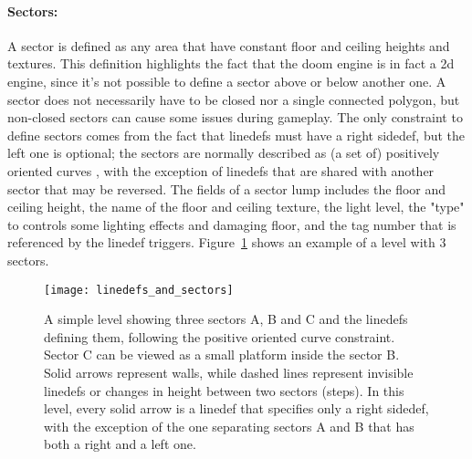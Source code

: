 \paragraph{Sectors:} A sector is defined as any area that have constant floor and ceiling heights and textures. This definition highlights the fact that the doom engine is in fact a 2d engine, since it's not possible to define a sector above or below another one. A sector does not necessarily have to be closed nor a single connected polygon, but non-closed sectors can cause some issues during gameplay. The only constraint to define sectors comes from the fact that linedefs must have a right sidedef, but the left one is optional; the sectors are normally described as (a set of) positively oriented curves \cite{poly_orient}, with the exception of linedefs that are shared with another sector that may be reversed. The fields of a sector lump includes the floor and ceiling height, the name of the floor and ceiling texture, the light level, the "type" to controls some lighting effects and damaging floor, and the tag number that is referenced by the linedef triggers. Figure~\ref{fig:sectors} shows an example of a level with 3 sectors.


\begin{figure}
	\begin{center}
		\texttt{[image: linedefs\_and\_sectors]}
	\end{center}
	
	\captionsetup{width=0.8\linewidth}
	\caption[A simple level showing sectors and linedefs]{A simple level showing three sectors A, B and C and the linedefs defining them, following the positive oriented curve constraint. Sector C can be viewed as a small platform inside the sector B. Solid arrows represent walls, while dashed lines represent invisible linedefs or changes in height between two sectors (steps). In this level, every solid arrow is a linedef that specifies only a right sidedef, with the exception of the one separating sectors A and B that has both a right and a left one.}
	\label{fig:sectors}
	\medskip
	
\end{figure}


